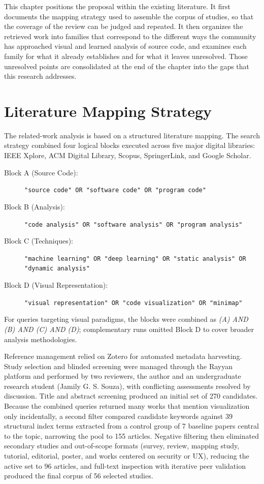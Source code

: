 This chapter positions the proposal within the existing literature. It first
documents the mapping strategy used to assemble the corpus of studies, so that
the coverage of the review can be judged and repeated. It then organizes the
retrieved work into families that correspond to the different ways the community
has approached visual and learned analysis of source code, and examines each
family for what it already establishes and for what it leaves unresolved. Those
unresolved points are consolidated at the end of the chapter into the gaps that
this research addresses.

\section{Literature Mapping Strategy}

The related-work analysis is based on a structured literature mapping. The
search strategy combined four logical blocks executed across five major digital
libraries: IEEE Xplore, ACM Digital Library, Scopus, SpringerLink, and Google
Scholar.

\begin{description}
    \item[Block A (Source Code):] \texttt{"source code" OR "software code" OR "program code"}
    \item[Block B (Analysis):] \texttt{"code analysis" OR "software analysis" OR "program analysis"}
    \item[Block C (Techniques):] \texttt{"machine learning" OR "deep learning" OR "static analysis" OR "dynamic analysis"}
    \item[Block D (Visual Representation):] \texttt{"visual representation" OR "code visualization" OR "minimap"}
\end{description}

For queries targeting visual paradigms, the blocks were combined as
\textit{(A) AND (B) AND (C) AND (D)}; complementary runs omitted Block D to
cover broader analysis methodologies.

Reference management relied on Zotero for automated metadata harvesting. Study
selection and blinded screening were managed through the Rayyan platform and
performed by two reviewers, the author and an undergraduate research student
(Jamily G. S. Souza), with conflicting assessments resolved by discussion.
Title and abstract screening produced an initial set of 270 candidates.
Because the combined queries returned many works that mention visualization
only incidentally, a second filter compared candidate keywords against 39
structural index terms extracted from a control group of 7 baseline papers
central to the topic, narrowing the pool to 155 articles. Negative filtering
then eliminated secondary studies and out-of-scope formats (survey, review,
mapping study, tutorial, editorial, poster, and works centered on security or
UX), reducing the active set to 96 articles, and full-text inspection with
iterative peer validation produced the final corpus of 56 selected studies.

